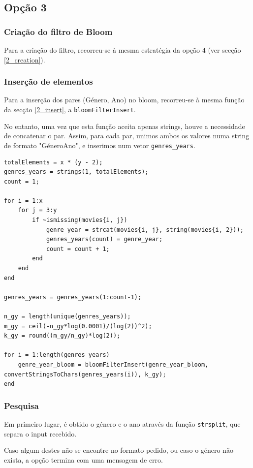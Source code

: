 \documentclass[portuguese, 11pt, a4paper,titlepage, oneside]{article}
\begin{document}
\subsection{Opção 3}
\subsubsection{Criação do filtro de Bloom}
Para a criação do filtro, recorreu-se à mesma estratégia da opção 4 (ver secção \ref{2_creation}).

\subsubsection{Inserção de elementos}
Para a inserção dos pares (Género, Ano) no bloom, recorreu-se à mesma função da secção \ref{2_insert}, a \verb|bloomFilterInsert|.

No entanto, uma vez que esta função aceita apenas strings, houve a necessidade de concatenar o par. Assim, para cada par, unimos ambos os valores numa string de formato "GéneroAno", e inserimos num vetor \verb|genres_years|.

\begin{lstlisting}[style=Matlab-editor]
totalElements = x * (y - 2);
genres_years = strings(1, totalElements);
count = 1;

for i = 1:x
    for j = 3:y
        if ~ismissing(movies{i, j})
            genre_year = strcat(movies{i, j}, string(movies{i, 2}));
            genres_years(count) = genre_year;
            count = count + 1;
        end
    end
end

genres_years = genres_years(1:count-1);

n_gy = length(unique(genres_years));
m_gy = ceil(-n_gy*log(0.0001)/(log(2))^2);
k_gy = round((m_gy/n_gy)*log(2));

for i = 1:length(genres_years)
    genre_year_bloom = bloomFilterInsert(genre_year_bloom, convertStringsToChars(genres_years(i)), k_gy);
end
\end{lstlisting}

\subsubsection{Pesquisa}
Em primeiro lugar, é obtido o género e o ano através da função \verb|strsplit|, que separa o input recebido.

Caso algum destes não se encontre no formato pedido, ou caso o género não exista, a opção termina com uma mensagem de erro.
\end{document}
